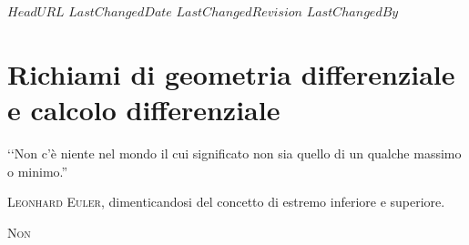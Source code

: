 \svnidlong
{$HeadURL$}
{$LastChangedDate$}
{$LastChangedRevision$}
{$LastChangedBy$}

\chapter{Richiami di geometria differenziale e calcolo differenziale}
\begin{introduction}
	‘‘Non c'è niente nel mondo il cui significato non sia quello di un qualche massimo o minimo.''
	\begin{flushright}
		\textsc{Leonhard Euler,} dimenticandosi del concetto di estremo inferiore e superiore. %
	\end{flushright}
\end{introduction}
\lettrine[findent=1pt, nindent=0pt]{N}{on} %

